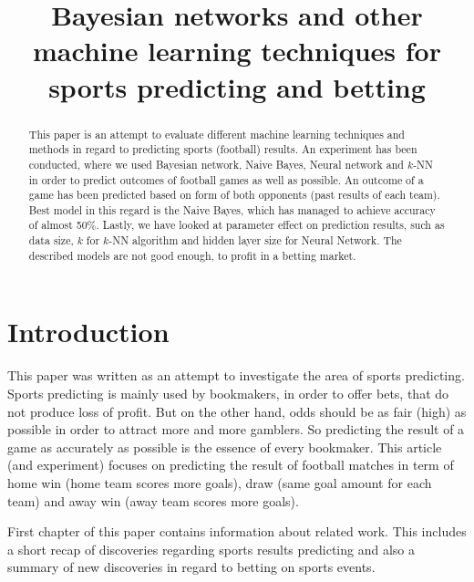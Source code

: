 \documentclass[conference]{IEEEtran}
\begin{document}
\title{Bayesian networks and other machine learning techniques for sports predicting and betting}

\author{
}


\maketitle

\begin{abstract}
This paper is an attempt to evaluate different machine learning techniques and methods in regard to predicting
sports (football) results. An experiment has been conducted, where we used Bayesian network, Naive Bayes, 
Neural network and $k$-NN in order to predict outcomes of football games as well as possible. An outcome
of a game has been predicted based on form of both opponents (past results of each team). Best model
in this regard is the Naive Bayes, which has managed to achieve accuracy of almost 50\%. Lastly, we have looked
at parameter effect on prediction results, such as data size, $k$ for $k$-NN algorithm and hidden layer size
for Neural Network. The described models are not good enough, to profit in a betting market.

\end{abstract}

\IEEEpeerreviewmaketitle

\section{Introduction}

This paper was written as an attempt to investigate the area of sports predicting.
Sports predicting is mainly used by bookmakers, in order to offer bets, that do 
not produce loss of profit. But on the other hand, odds should be as fair (high) as possible
in order to attract more and more gamblers. So predicting the result of a game as accurately
as possible is the essence of every bookmaker. This article (and experiment) focuses on 
predicting the result of football matches in term of home win (home team scores more goals),
draw (same goal amount for each team) and away win (away team scores more goals).

First chapter of this paper contains information about related work. This includes a 
short recap of discoveries regarding sports results predicting and also a summary of 
new discoveries in regard to betting on sports events.
\end{document}
